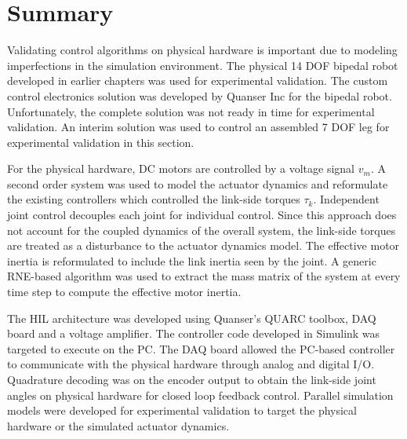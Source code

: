 


\section{Summary} %
\label{sec:experiments_summary}
Validating control algorithms on physical hardware is important due to modeling imperfections in the simulation environment. The physical 14 DOF bipedal robot developed in earlier chapters was used for experimental validation. The custom control electronics solution was developed by Quanser Inc for the bipedal robot. Unfortunately, the complete solution was not ready in time for experimental validation. An interim solution was used to control an assembled 7 DOF leg for experimental validation in this section. 

For the physical hardware, DC motors are controlled by a voltage signal $v_m$. A second order system was used to model the actuator dynamics and reformulate the existing controllers which controlled the link-side torques $\tau _k$. Independent joint control decouples each joint for individual control. Since this approach does not account for the coupled dynamics of the overall system, the link-side torques are treated as a disturbance to the actuator dynamics model. The effective motor inertia is reformulated to include the link inertia seen by the joint. A generic RNE-based algorithm was used to extract the mass matrix of the system at every time step to compute the effective motor inertia.

The HIL architecture was developed using Quanser's QUARC toolbox, DAQ board and a voltage amplifier. The controller code developed in Simulink was targeted to execute on the PC. The DAQ board allowed the PC-based controller to communicate with the physical hardware through analog and digital I/O. Quadrature decoding was on the encoder output to obtain the link-side joint angles on physical hardware for closed loop feedback control. Parallel simulation models were developed for experimental validation to target the physical hardware or the simulated actuator dynamics. 

